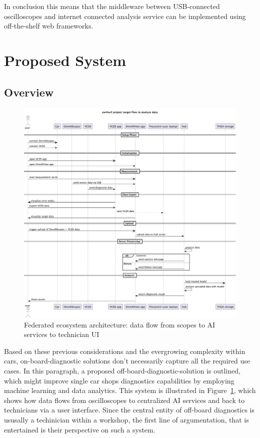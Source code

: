 In conclusion this means that the middleware between USB-connected oscilloscopes and internet connected analysis service can be implemented using off-the-shelf web frameworks.

\section{Proposed System}
\subsection{Overview}
\begin{figure}[t]
  \centering
  \includegraphics[width=\textwidth]{figures/aw4null_project_target_flow_to_analyze_data.pdf}
  \caption{Federated ecosystem architecture: data flow from scopes to AI services to technician UI}
  \label{fig:system_architecture}
\end{figure}
Based on these previous considerations and the evergrowing complexity within cars, on-board-diagnostic solutions don't necessarily capture all the required use cases.
In this paragraph, a proposed off-board-diagnostic-solution is outlined, which might improve single car shops diagnostics capabilities by employing machine learning and data analytics. 
This system is illustrated in Figure~\ref{fig:system_architecture}, which shows how data flows from oscilloscopes to centralized AI services and back to technicians via a user interface.
Since the central entity of off-board diagnostics is ususally a techinician within a workshop, the first line of argumentation, that is entertained is their perspective on such a system.

